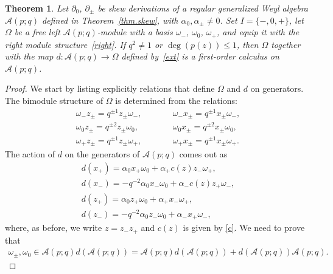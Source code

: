 \documentclass[10pt,a4paper]{amsart}
\numberwithin{equation}{section}
\newtheorem{Theorem}{Theorem}[section]
\def\AWeyl#1#2{{\mathcal{A}}(#1;#2)}
\begin{document}
\begin{Theorem}\label{thm.calc.A}
Let $\partial_0$, $\partial_\pm$ be skew derivations of a regular generalized Weyl algebra $\AWeyl p q$ defined in Theorem~{\rm \ref{thm.skew}}, with $\alpha_0, \alpha_\pm \neq 0$. Set $I = \{-,0,+\}$, let $\Omega$ be a free left $\AWeyl p q$-module with a basis $\omega_-$, $\omega_0$, $\omega_+$, and equip it with the right module structure~\eqref{right}. If $q^2 \neq 1$ or $\deg(p(z))\leq 1$, then $\Omega$ together with the map $d\colon \AWeyl p q\to \Omega$ defined by~\eqref{ext} is a first-order calculus on~$\AWeyl p q$.
\end{Theorem}

\begin{proof}
We start by listing explicitly relations that def\/ine $\Omega$ and $d$ on generators. The bimodule structure of $\Omega$ is determined from the relations:
\begin{subequations}\label{omegas}
\begin{alignat}{3}
& \omega_- z_\pm = q^{\pm 1} z_\pm\omega_-, \qquad && \omega_- x_\pm = q^{\pm 1} x_\pm \omega_-,&\label{omega-}
\\
& \omega_0 z_\pm = q^{\pm 2} z_\pm\omega_0, \qquad && \omega_0 x_\pm = q^{\pm 2} x_\pm\omega_0 ,&\label{omega0}
\\
& \omega_+z_\pm = q^{\pm 1} z_\pm\omega_+, \qquad && \omega_+ x_\pm = q^{\pm 1} x_\pm \omega_+. &\label{omega+}
\end{alignat}
\end{subequations}
The action of $d$ on the generators of $\AWeyl p q$ comes out as
\begin{subequations}\label{d.gen}
\begin{gather}
d(x_+) = \alpha_0 x_+ \omega_0 + \alpha_+c(z)z_- \omega_+, \label{dx+}
\\
d(x_-) = -q^{-2}\alpha_0 x_- \omega_0 + \alpha_-c(z)z_+\omega_-, \label{dx-}
\\
d(z_+) = \alpha_0 z_+ \omega_0 + \alpha_+x_- \omega_+, \label{dz+}
\\
d(z_-) = -q^{-2}\alpha_0 z_- \omega_0 + \alpha_-x_+ \omega_-, \label{dz-}
\end{gather}
\end{subequations}
where, as before, we write $z = z_-z_+$ and $c(z)$ is given by \eqref{c}.
We need to prove that
\begin{gather*}
\omega_\pm, \omega_0\in \AWeyl p q d (\AWeyl p q ) = \AWeyl p q d (\AWeyl p q )+ d (\AWeyl p q ) \AWeyl p q .
\end{gather*}

\end{proof}
\end{document}
